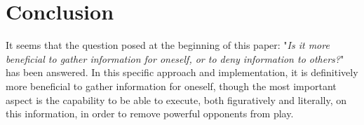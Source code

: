 \section{Conclusion}\label{sec:conclusion}
It seems that the question posed at the 
beginning of this paper: "\textit{Is it more beneficial 
to gather information for oneself, or to deny 
information to others?}" has been answered. In this 
specific approach and implementation, it is 
definitively more beneficial to gather information for 
oneself, though the most important aspect is the 
capability to be able to execute, both figuratively and 
literally, on this information, in order to remove 
powerful opponents from play. 
